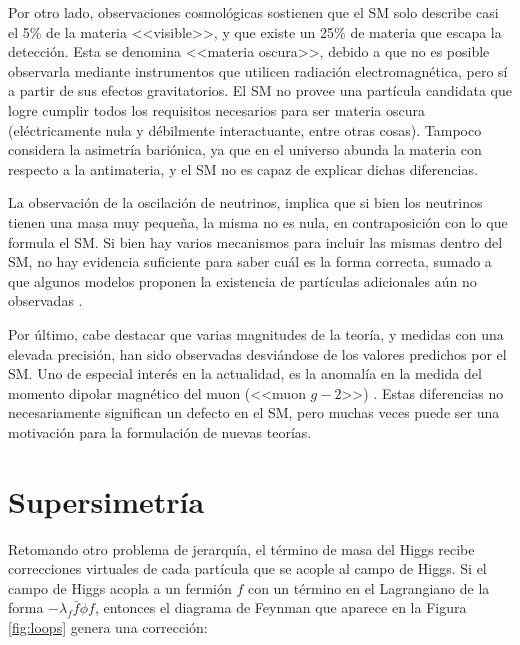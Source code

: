 Por otro lado, observaciones cosmológicas sostienen que el SM solo describe casi el 5\% de la materia <<visible>>, y que existe un 25\% de materia que escapa la detección. Esta se denomina <<materia oscura>>, debido a que no es posible observarla mediante instrumentos que utilicen radiación electromagnética, pero sí a partir de sus efectos gravitatorios. El SM no provee una partícula candidata que logre cumplir todos los requisitos necesarios para ser materia oscura (eléctricamente nula y débilmente interactuante, entre otras cosas). Tampoco considera la asimetría bariónica, ya que en el universo abunda la materia con respecto a la antimateria, y el SM no es capaz de explicar dichas diferencias.

La observación de la oscilación de neutrinos, implica que si bien los neutrinos tienen una masa muy pequeña, la misma no es nula, en contraposición con lo que formula el SM. Si bien hay varios mecanismos para incluir las mismas dentro del SM, no hay evidencia suficiente para saber cuál es la forma correcta, 
sumado a que algunos modelos proponen la existencia de partículas adicionales aún no observadas \cite{MOHAPATRA_2005}.

Por último, cabe destacar que varias magnitudes de la teoría, y medidas con una elevada precisión, han sido observadas desviándose de los valores predichos por el SM. Uno de especial interés en la actualidad, es la anomalía en la medida del momento dipolar magnético del muon (<<muon $g-2$>>) \cite{PhysRevLett.126.141801}. Estas diferencias no necesariamente significan un defecto en el SM, pero muchas veces puede ser una motivación para la formulación de nuevas teorías.

\section{Supersimetría}\label{sec:susy}

Retomando otro problema de jerarquía, el término de masa del Higgs recibe correcciones virtuales de cada partícula que se acople al campo de Higgs. 
Si el campo de Higgs acopla a un fermión $f$ con un término en el Lagrangiano de la forma $-\lambda_f \bar{f} \phi f$, entonces el diagrama de Feynman que aparece en la Figura \ref{fig:loops} genera una corrección:


